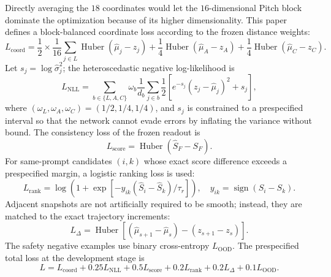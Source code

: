\documentclass{article}
\begin{document}
Directly averaging the $18$ coordinates would let the $16$-dimensional Pitch block dominate the optimization because of its higher dimensionality. This paper defines a block-balanced coordinate loss according to the frozen distance weights:
\begin{equation}
L_{\mathrm{coord}}={}
\frac{1}{2} \times \frac{1}{16}\sum_{j\in L}
\operatorname{Huber}(\hat{\mu}_j-z_j)
+\frac{1}{4}\operatorname{Huber}(\hat{\mu}_A-z_A)
+\frac{1}{4}\operatorname{Huber}(\hat{\mu}_C-z_C).
\label{eq:block_balanced_loss}
\end{equation}
Let $s_j=\log\hat{\sigma}_j^2$; the heteroscedastic negative log-likelihood is
\begin{equation}
L_{\mathrm{NLL}}=
\sum_{b\in\{L,A,C\}}\omega_b\frac{1}{d_b}\sum_{j\in b}
\frac{1}{2}\left[e^{-s_j}(z_j-\hat{\mu}_j)^2+s_j\right],
\end{equation}
where $(\omega_L,\omega_A,\omega_C)=(1/2,1/4,1/4)$, and $s_j$ is constrained to a prespecified interval so that the network cannot evade errors by inflating the variance without bound. The consistency loss of the frozen readout is
\begin{equation}
L_{\mathrm{score}}=\operatorname{Huber}(\hat{S}_F-S_F).
\end{equation}
For same-prompt candidates $(i,k)$ whose exact score difference exceeds a prespecified margin, a logistic ranking loss is used:
\begin{equation}
L_{\mathrm{rank}}=\log\left(1+
\exp\left[-y_{ik}(\hat{S}_i-\hat{S}_k)/\tau_r\right]\right),
\quad y_{ik}=\operatorname{sign}(S_i-S_k).
\end{equation}
Adjacent snapshots are not artificially required to be smooth; instead, they are matched to the exact trajectory increments:
\begin{equation}
L_{\Delta}=\operatorname{Huber}\left[
(\hat{\mu}_{s+1}-\hat{\mu}_s)-(z_{s+1}-z_s)\right].
\end{equation}
The safety negative examples use binary cross-entropy $L_{\mathrm{OOD}}$. The prespecified total loss at the development stage is
\begin{equation}
L=L_{\mathrm{coord}}+0.25L_{\mathrm{NLL}}+0.5L_{\mathrm{score}}
+0.2L_{\mathrm{rank}}+0.2L_{\Delta}+0.1L_{\mathrm{OOD}}.
\label{eq:ltsn_total_loss}
\end{equation}
\end{document}
